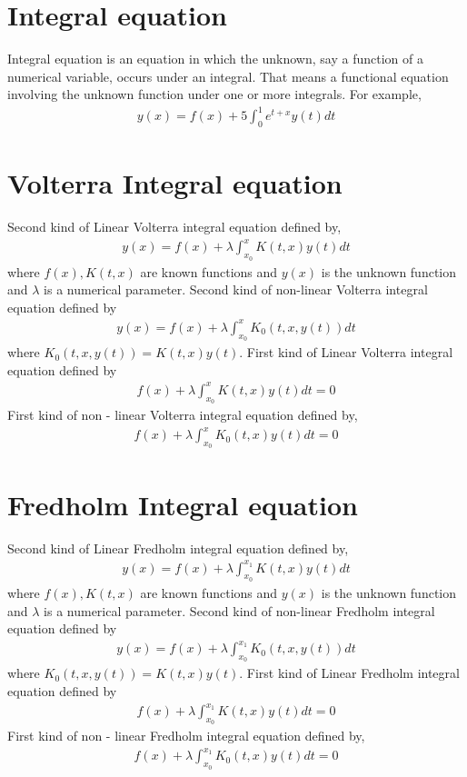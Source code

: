 \documentclass[11pt]{report}
\begin{document}
	\section{Integral equation}
	Integral equation is an equation in which the unknown, say a function of a numerical variable, occurs under an integral. That means a functional equation involving the unknown function under one or more integrals. For example,
	\begin{eqnarray*}
		y(x) = f(x) + 5 \int_{0}^{1} e^{t+x} y(t)dt
	\end{eqnarray*}
		
	\section{Volterra Integral equation}
	Second kind of Linear Volterra integral equation defined by,
	\begin{eqnarray*}
		y(x) = f(x) + \lambda\int_{x_0}^{x} K(t,x)y(t)dt
	\end{eqnarray*}
	where $f(x), K(t,x)$ are known functions and $y(x)$ is the unknown function and $\lambda$ is a numerical parameter. Second kind of non-linear Volterra integral equation defined by 
	\begin{eqnarray*}
		y(x) = f(x) + \lambda\int_{x_0}^{x}K_0(t,x,y(t))dt
	\end{eqnarray*}
	where $K_0(t, x, y(t)) = K(t, x)y(t)$. First kind of Linear Volterra integral equation defined by
	\begin{eqnarray*}
			f(x) + \lambda\int_{x_0}^{x}K(t,x)y(t)dt= 0
	\end{eqnarray*}
	First kind of non - linear Volterra integral equation defined by,
	\begin{eqnarray*}
		f(x) + \lambda\int_{x_0}^{x}K_0(t,x)y(t)dt = 0
	\end{eqnarray*}
	
	\section{Fredholm Integral equation}
	Second kind of Linear Fredholm integral equation defined by,
	\begin{eqnarray*}
		y(x) = f(x) + \lambda\int_{x_0}^{x_1} K(t,x)y(t)dt
	\end{eqnarray*}
	where $f(x),K(t,x)$ are known functions and $y(x)$ is the unknown function and $\lambda$ is a numerical parameter.	Second kind of non-linear Fredholm integral equation defined by 
	\begin{eqnarray*}
		y(x) = f(x) + \lambda\int_{x_0}^{x_1}K_0(t,x,y(t))dt
	\end{eqnarray*}
	where $K_0(t, x, y(t)) = K(t, x)y(t)$. First kind of Linear Fredholm integral equation defined by
	\begin{eqnarray*}
		f(x) + \lambda\int_{x_0}^{x_1}K(t,x)y(t)dt= 0
	\end{eqnarray*}
	First kind of non - linear Fredholm integral equation defined by,
	\begin{eqnarray*}
		f(x) + \lambda\int_{x_0}^{x_1}K_0(t,x)y(t)dt= 0
	\end{eqnarray*}
	
\end{document}
